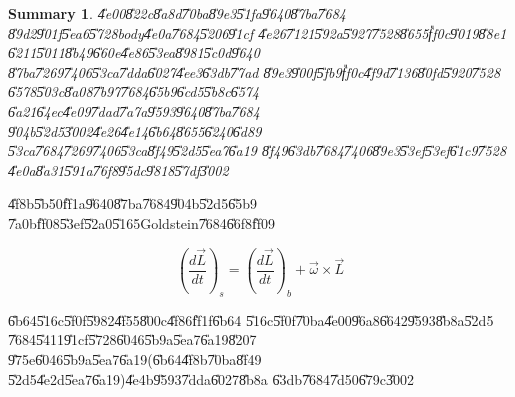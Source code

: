 \documentclass[12pt,a4paper]{article}
\newtheorem{summary}[theorem]{Summary}
\begin{document}
\begin{summary}
\U{4e00}\U{822c}\U{8a8d}\U{70ba}\U{89e3}\U{51fa}\U{9640}\U{87ba}\U{7684}%
\U{89d2}\U{901f}\U{5ea6}\U{5728}\hfill body\U{4e0a}\U{7684}\U{5206}\U{91cf}%
\U{4e26}\U{7121}\U{592a}\U{5927}\U{7528}\U{8655}\U{ff0c}\U{9019}\U{88e1}%
\U{6211}\U{5011}\U{8b49}\U{660e}\U{4e86}\U{53ea}\U{8981}\U{5c0d}\U{9640}%
\U{87ba}\U{7269}\U{7406}\U{53ca}\U{7dda}\U{6027}\U{4ee3}\U{63db}\U{77ad}%
\U{89e3}\U{900f}\U{5fb9}\U{ff0c}\U{4f9d}\U{7136}\U{80fd}\U{5920}\U{7528}%
\U{6578}\U{503c}\U{8a08}\U{7b97}\U{7684}\U{65b9}\U{6cd5}\U{5b8c}\U{6574}%
\U{6a21}\U{64ec}\U{4e09}\U{7dad}\U{7a7a}\U{9593}\U{9640}\U{87ba}\U{7684}%
\U{904b}\U{52d5}\U{3002}\U{4e26}\U{4e14}\U{6b64}\U{8655}\U{6240}\U{6d89}%
\U{53ca}\U{7684}\U{7269}\U{7406}\U{53ca}\U{8f49}\U{52d5}\U{5ea7}\U{6a19}%
\U{8f49}\U{63db}\U{7684}\U{7406}\U{89e3}\U{53ef}\U{53ef}\U{61c9}\U{7528}%
\U{4e0a}\U{8a31}\U{591a}\U{76f8}\U{95dc}\U{9818}\U{57df}\U{3002}
\end{summary}

\U{4f8b}\U{5b50}\U{ff1a}\U{9640}\U{87ba}\U{7684}\U{904b}\U{52d5}\U{65b9}%
\U{7a0b}\U{ff08}\U{53ef}\U{52a0}\U{5165}Goldstein\U{7684}\U{66f8}\U{ff09}

\begin{equation}
\left( \frac{d\vec{L}}{dt}\right) _{s}=\left( \frac{d\vec{L}}{dt}\right)
_{b}+\vec{\omega}\times \vec{L}
\end{equation}

\U{6b64}\U{516c}\U{5f0f}\U{5982}\U{4f55}\U{800c}\U{4f86}\U{ff1f}\U{6b64}%
\U{516c}\U{5f0f}\U{70ba}\U{4e00}\U{96a8}\U{6642}\U{9593}\U{8b8a}\U{52d5}%
\U{7684}\U{5411}\U{91cf}\U{5728}\U{6046}\U{5b9a}\U{5ea7}\U{6a19}\U{8207}%
\U{975e}\U{6046}\U{5b9a}\U{5ea7}\U{6a19}(\U{6b64}\U{4f8b}\U{70ba}\U{8f49}%
\U{52d5}\U{4e2d}\U{5ea7}\U{6a19})\U{4e4b}\U{9593}\U{7dda}\U{6027}\U{8b8a}%
\U{63db}\U{7684}\U{7d50}\U{679c}\U{3002}

\bigskip
\end{document}
